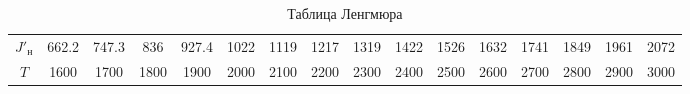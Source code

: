 \begin{table}[h]
    \centering
    \caption{Таблица Ленгмюра}
    \label{tab:lengmur}
    \footnotesize
    \begin{tabular}{||c||c|c|c|c|c|c|c|c|c|c|c|c|c|c|c|}
        \hline
        $J'_{\text{н}}$ & 662.2 & 747.3 & 836   & 927.4 & 1022  & 1119  & 1217  & 1319  & 1422  &
        1526  & 1632  & 1741  & 1849  & 1961  & 2072   \\

        $T$ & 1600 & 1700 & 1800 & 1900 & 2000 & 2100 & 2200 & 2300 & 2400 & 2500 &
        2600 & 2700 & 2800 & 2900 & 3000 \\
        \hline
    \end{tabular}
\end{table}





